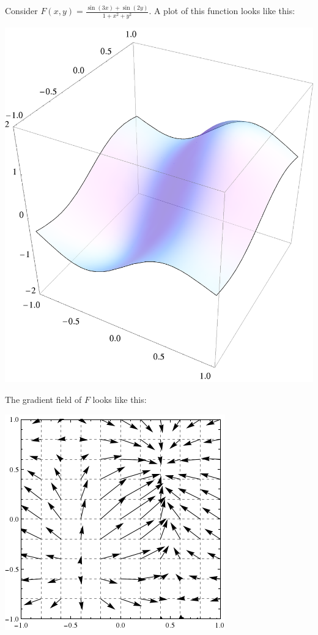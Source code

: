 \documentclass{ximera}
\begin{document}
\begin{example}
  Consider $F(x,y) = \frac{\sin(3x)+\sin(2y)}{1+x^2+y^2}$. A plot of
  this function looks like this:
  \begin{image}
    \includegraphics{surf1.png}
  \end{image}
  The gradient field of $F$ looks like this:
  \begin{image}
    \includegraphics{gradField1.png}

\end{image}
\end{example}
\end{document}
